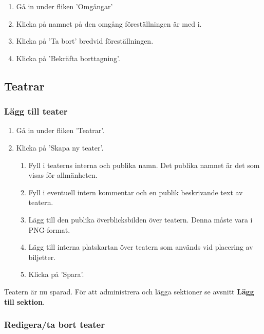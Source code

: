 \documentclass[a4paper, twoside, 11pt, titlepage]{article}
\begin{document}
		\begin{enumerate}
		\item Gå in under fliken 'Omgångar'

		\item Klicka på namnet på den omgång föreställningen är med i.

		\item Klicka på 'Ta bort' bredvid föreställningen.

		\item Klicka på 'Bekräfta borttagning'.
		\end{enumerate}

	\subsection{Teatrar}



		\subsubsection{Lägg till teater}


		\begin{enumerate}
		\item Gå in under fliken 'Teatrar'.

		\item Klicka på 'Skapa ny teater'.

		\begin{enumerate}
		\item Fyll i teaterns interna och publika namn. Det publika namnet är det som visas för allmänheten.

		\item Fyll i eventuell intern kommentar och en publik beskrivande text av teatern.

		\item Lägg till den publika överblicksbilden över teatern. Denna måste vara i PNG-format.

		\item Lägg till interna platskartan över teatern som används vid placering av biljetter.

		\item Klicka på 'Spara'.
		\end{enumerate}
		\end{enumerate}

		Teatern är nu sparad. För att administrera och lägga sektioner se avsnitt \textbf{Lägg till sektion}.

		\subsubsection{Redigera/ta bort teater}
\end{document}
